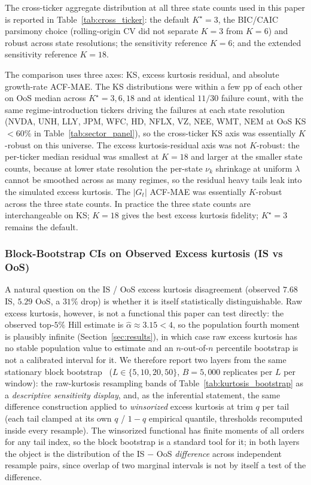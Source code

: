 The cross-ticker aggregate distribution at all three state counts used in this paper is reported in Table~\ref{tab:cross_ticker}: the default $K^\star = 3$, the BIC/CAIC parsimony choice (rolling-origin CV did not separate $K = 3$ from $K = 6$) and robust across state resolutions; the sensitivity reference $K = 6$; and the extended sensitivity reference $K = 18$.

The comparison uses three axes: KS, excess kurtosis residual, and absolute growth-rate ACF-MAE. The KS distributions were within a few pp of each other on OoS median across $K^\star = 3, 6, 18$ and at identical $11/30$ failure count, with the same regime-introduction tickers driving the failures at each state resolution (NVDA, UNH, LLY, JPM, WFC, HD, NFLX, VZ, NEE, WMT, NEM at OoS KS $< 60\%$ in Table~\ref{tab:sector_panel}), so the cross-ticker KS axis was essentially $K$-robust on this universe. The excess kurtosis-residual axis was not $K$-robust: the per-ticker median residual was smallest at $K = 18$ and larger at the smaller state counts, because at lower state resolution the per-state $\nu_k$ shrinkage at uniform $\lambda$ cannot be smoothed across as many regimes, so the residual heavy tails leak into the simulated excess kurtosis. The $|G_t|$ ACF-MAE was essentially $K$-robust across the three state counts. In practice the three state counts are interchangeable on KS; $K = 18$ gives the best excess kurtosis fidelity; $K^\star = 3$ remains the default.

\subsubsection{Block-Bootstrap CIs on Observed Excess kurtosis (IS vs OoS)}
\label{sec:kurtosis_bootstrap_ci}

A natural question on the IS / OoS excess kurtosis disagreement (observed $7.68$ IS, $5.29$ OoS, a $31\%$ drop) is whether it is itself statistically distinguishable. Raw excess kurtosis, however, is not a functional this paper can test directly: the observed top-$5\%$ Hill estimate is $\hat\alpha \approx 3.15 < 4$, so the population fourth moment is plausibly infinite (Section~\ref{sec:results}), in which case raw excess kurtosis has no stable population value to estimate and an $n$-out-of-$n$ percentile bootstrap is not a calibrated interval for it. We therefore report two layers from the same stationary block bootstrap~\citep{politis1994stationary} ($L \in \{5, 10, 20, 50\}$, $B = 5{,}000$ replicates per $L$ per window): the raw-kurtosis resampling bands of Table~\ref{tab:kurtosis_bootstrap} as a \emph{descriptive sensitivity display}, and, as the inferential statement, the same difference construction applied to \emph{winsorized} excess kurtosis at trim $q$ per tail (each tail clamped at its own $q$ / $1-q$ empirical quantile, thresholds recomputed inside every resample). The winsorized functional has finite moments of all orders for any tail index, so the block bootstrap is a standard tool for it; in both layers the object is the distribution of the IS $-$ OoS \emph{difference} across independent resample pairs, since overlap of two marginal intervals is not by itself a test of the difference.


